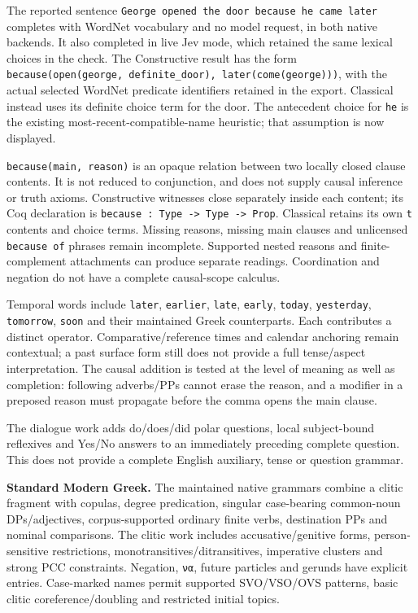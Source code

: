 \documentclass[11pt,a4paper]{article}
\begin{document}
The reported sentence
\texttt{George\ opened\ the\ door\ because\ he\ came\ later} completes
with WordNet vocabulary and no model request, in both native backends.
It also completed in live Jev mode, which retained the same lexical
choices in the check. The Constructive result has the form
\texttt{because(open(george,\ definite\_door),\ later(come(george)))},
with the actual selected WordNet predicate identifiers retained in the
export. Classical instead uses its definite choice term for the door.
The antecedent choice for \texttt{he} is the existing
most-recent-compatible-name heuristic; that assumption is now displayed.

\texttt{because(main,\ reason)} is an opaque relation between two
locally closed clause contents. It is not reduced to conjunction, and
does not supply causal inference or truth axioms. Constructive witnesses
close separately inside each content; its Coq declaration is
\texttt{because\ :\ Type\ -\textgreater{}\ Type\ -\textgreater{}\ Prop}.
Classical retains its own \texttt{t} contents and choice terms. Missing
reasons, missing main clauses and unlicensed \texttt{because\ of}
phrases remain incomplete. Supported nested reasons and
finite-complement attachments can produce separate readings.
Coordination and negation do not have a complete causal-scope calculus.

Temporal words include \texttt{later}, \texttt{earlier}, \texttt{late},
\texttt{early}, \texttt{today}, \texttt{yesterday}, \texttt{tomorrow},
\texttt{soon} and their maintained Greek counterparts. Each contributes
a distinct operator. Comparative/reference times and calendar anchoring
remain contextual; a past surface form still does not provide a full
tense/aspect interpretation. The causal addition is tested at the level
of meaning as well as completion: following adverbs/PPs cannot erase the
reason, and a modifier in a preposed reason must propagate before the
comma opens the main clause.

The dialogue work adds do/does/did polar questions, local subject-bound
reflexives and Yes/No answers to an immediately preceding complete
question. This does not provide a complete English auxiliary, tense or
question grammar.

\textbf{Standard Modern Greek.} The maintained native grammars combine a
clitic fragment with copulas, degree predication, singular case-bearing
common-noun DPs/adjectives, corpus-supported ordinary finite verbs,
destination PPs and nominal comparisons. The clitic work includes
accusative/genitive forms, person-sensitive restrictions,
monotransitives/ditransitives, imperative clusters and strong PCC
constraints. Negation, \texttt{να}, future particles and gerunds have
explicit entries. Case-marked names permit supported SVO/VSO/OVS
patterns, basic clitic coreference/doubling and restricted initial
topics.
\end{document}
